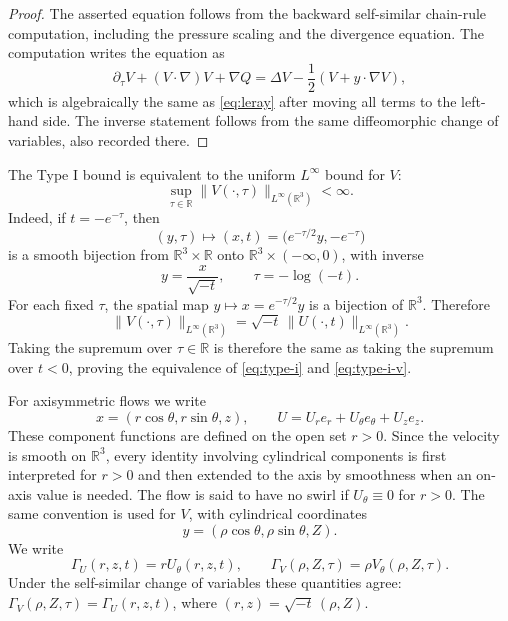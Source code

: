 \documentclass[11pt]{amsart}
\theoremstyle{plain}
\theoremstyle{definition}
\theoremstyle{remark}
\numberwithin{equation}{section}
\begin{document}
\begin{proof}
The asserted equation follows from the backward self-similar chain-rule
computation, including the pressure scaling and the divergence equation.  The
computation writes the equation as
\[
   \partial_\tau V+(V\cdot\nabla)V+\nabla Q
   =
   \Delta V-\frac12(V+y\cdot\nabla V),
\]
which is algebraically the same as \eqref{eq:leray} after moving all terms to
the left-hand side.  The inverse statement follows from the same
diffeomorphic change of variables, also recorded there.
\end{proof}

The Type I bound is equivalent to the uniform \(L^\infty\) bound for \(V\):
\begin{equation}\label{eq:type-i-v}
\sup_{\tau\in\mathbb R}\|V(\cdot,\tau)\|_{L^\infty(\mathbb R^3)}<\infty .
\end{equation}
Indeed, if \(t=-e^{-\tau}\), then
\[
   (y,\tau)\longmapsto (x,t)=\bigl(e^{-\tau/2}y,-e^{-\tau}\bigr)
\]
is a smooth bijection from
\(\mathbb R^3\times\mathbb R\) onto
\(\mathbb R^3\times(-\infty,0)\), with inverse
\[
   y=\frac{x}{\sqrt{-t}},\qquad \tau=-\log(-t).
\]
For each fixed \(\tau\), the spatial map \(y\mapsto x=e^{-\tau/2}y\) is a
bijection of \(\mathbb R^3\).  Therefore
\[
\|V(\cdot,\tau)\|_{L^\infty(\mathbb R^3)}
=\sqrt{-t}\,\|U(\cdot,t)\|_{L^\infty(\mathbb R^3)}.
\]
Taking the supremum over \(\tau\in\mathbb R\) is therefore the same as taking
the supremum over \(t<0\), proving the equivalence of
\eqref{eq:type-i} and \eqref{eq:type-i-v}.

For axisymmetric flows we write
\[
x=(r\cos\theta,r\sin\theta,z),\qquad
U=U_r e_r+U_\theta e_\theta+U_z e_z.
\]
These component functions are defined on the open set \(r>0\).  Since the
velocity is smooth on \(\mathbb R^3\), every identity involving cylindrical
components is first interpreted for \(r>0\) and then extended to the axis by
smoothness when an on-axis value is needed.  The flow is said to have no swirl
if \(U_\theta\equiv0\) for \(r>0\).  The same convention is used for \(V\),
with cylindrical coordinates
\[
y=(\rho\cos\theta,\rho\sin\theta,Z).
\]
We write
\[
   \Gamma_U(r,z,t)=rU_\theta(r,z,t),\qquad
   \Gamma_V(\rho,Z,\tau)=\rho V_\theta(\rho,Z,\tau).
\]
Under the self-similar change of variables these quantities agree:
\(\Gamma_V(\rho,Z,\tau)=\Gamma_U(r,z,t)\), where
\((r,z)=\sqrt{-t}\,(\rho,Z)\).
\end{document}
